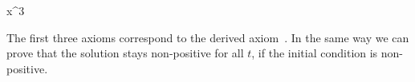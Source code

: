 \begin{example}
\begin{sequentdeduction}
{{{{                                \land
                            }
                        }{
                            \limply
                            x^3
                            \land
                            \land
                        }
                    }{
                        \limply
                        \land
                    }
                }{
                    \limply
                }
            \end{sequentdeduction}
            \normalsize
            The first three axioms correspond to the derived axiom~.
            In the same way we can prove that the solution stays non-positive for all $t$, if the initial condition is non-positive.
        \end{example}

